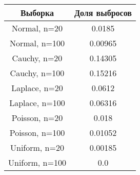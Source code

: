 \begin{table}[H]
    \centering
    \begin{tabular}{c|c}
        Выборка & Доля выбросов \\
        \hline
        Normal, n=20 & 0.0185 \\
        Normal, n=100 & 0.00965 \\
        Cauchy, n=20 & 0.14305 \\
        Cauchy, n=100 & 0.15216 \\
        Laplace, n=20 & 0.0612 \\
        Laplace, n=100 & 0.06316 \\
        Poisson, n=20 & 0.018 \\
        Poisson, n=100 & 0.01052 \\
        Uniform, n=20 & 0.00185 \\
        Uniform, n=100 & 0.0 \\

    \end{tabular}
    \caption{}
    \label{}
\end{table}